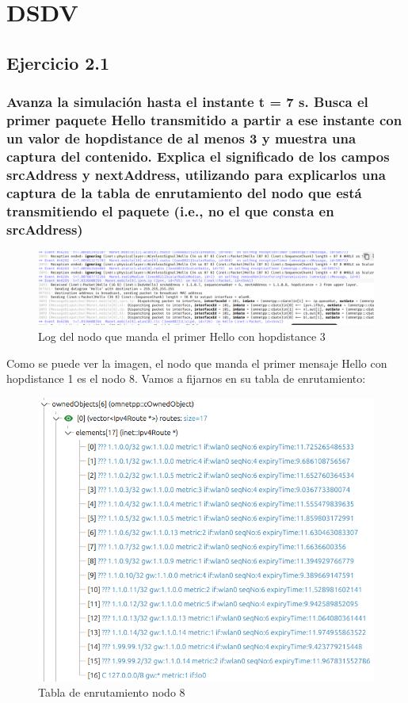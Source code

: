 \chapter{DSDV}
\label{chap:dsdv}

\section{Ejercicio 2.1}

\subsection{Avanza la simulación hasta el instante t = 7 s. Busca el primer paquete Hello transmitido a partir a ese
instante con un valor de hopdistance de al menos 3 y muestra una captura del contenido. Explica el significado
de los campos srcAddress y nextAddress, utilizando para explicarlos una captura de la tabla de enrutamiento del
nodo que está transmitiendo el paquete (i.e., no el que consta en srcAddress)}

\begin{figure}[H]
    \centering
    \includegraphics[width=155mm, scale=0.75]{imaxes/dsdv/ejercicio2_1.png}
    \caption{Log del nodo que manda el primer Hello con hopdistance 3}
    \label{fig:ejer2_1}
\end{figure}

Como se puede ver la imagen, el nodo que manda el primer mensaje Hello con hopdistance 1 es el nodo 8. Vamos a fijarnos en su tabla de enrutamiento:

\begin{figure}[H]
    \centering
    \includegraphics[width=115mm, scale=0.75]{imaxes/dsdv/ejercicio2_1_2.png}
    \caption{Tabla de enrutamiento nodo 8}
    \label{fig:ejer2_1_2}
\end{figure}

